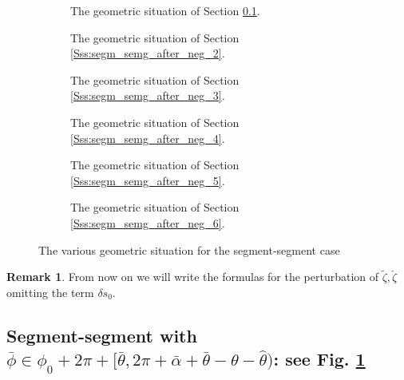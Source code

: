 \documentclass[reqno]{amsart}
\theoremstyle{definition} \newtheorem{definition}{Definition}[section]
\theoremstyle{definition} \newtheorem{remark}[definition]{Remark}
\theoremstyle{plain} \newtheorem{lemma}[definition]{Lemma}
\theoremstyle{plain} \newtheorem{proposition}[definition]{Proposition}
\theoremstyle{plain} \newtheorem{theorem}[definition]{Theorem}
\theoremstyle{plain} \newtheorem{corollary}[definition]{Corollary}
\theoremstyle{definition} \newtheorem{example}[definition]{Example}
\theoremstyle{plain} \newtheorem{claim}[clai]{Claim}
\theoremstyle{definition} \newtheorem{assumption}[definition]{Assumption}
\theoremstyle{definition} \newtheorem{observation}[definition]{Observation}
\newcommand{\1}{\mathbbm 1}
\numberwithin{equation}{section} %
\theoremstyle{plain} \newtheorem*{theorem*}{Theorem}
\theoremstyle{plain} \newtheorem{mthm}[maintheorem]{Main Theorem}
\theoremstyle{plain} \newtheorem*{mthm*}{Main Theorem}
\theoremstyle{plain} \newtheorem*{conjecture*}{Conjecture}
\theoremstyle{plain} \newtheorem{conjecture}[definition]{Conjecture}
\theoremstyle{plain} \newtheorem*{problem*}{Problem}
\begin{document}
\begin{figure}
\begin{subfigure}{.453\textwidth}
\resizebox{\linewidth}{!}{}
\caption{The geometric situation of Section \ref{Sss:segm_semg_after_neg}.}
\label{Fig:segm_segm_sat_1}
\end{subfigure}
\hfill
\begin{subfigure}{.453\linewidth}
\resizebox{\linewidth}{!}{}
\caption{The geometric situation of Section \ref{Sss:segm_semg_after_neg_2}.}
\label{Fig:segm_segm_sat_2}
\end{subfigure}
\begin{subfigure}{.453\textwidth}
\resizebox{\linewidth}{!}{}
\caption{The geometric situation of Section \ref{Sss:segm_semg_after_neg_3}.}
\label{Fig:segm_segm_sat_3}
\end{subfigure}
\hfill
\begin{subfigure}{.453\linewidth}
\resizebox{\linewidth}{!}{}
\caption{The geometric situation of Section \ref{Sss:segm_semg_after_neg_4}.}
\label{Fig:segm_segm_sat_4}
\end{subfigure}
\begin{subfigure}{.453\textwidth}
\resizebox{\linewidth}{!}{}
\caption{The geometric situation of Section \ref{Sss:segm_semg_after_neg_5}.}
\label{Fig:segm_segm_sat_5}
\end{subfigure}
\hfill
\begin{subfigure}{.453\linewidth}
\resizebox{\linewidth}{!}{}
\caption{The geometric situation of Section \ref{Sss:segm_semg_after_neg_6}.}
\label{Fig:segm_segm_sat_6}
\end{subfigure}
\caption{The various geometric situation for the segment-segment case}
\label{Fig:segm_segm_sat_tot}
\end{figure}

\bigskip

\begin{remark}
\label{Rem:divide_deltas_0}
From now on we will write the formulas for the perturbation of $\tilde \zeta, \check \zeta$ omitting the term $\delta s_0$.
\end{remark}

\bigskip


\subsection{Segment-segment with \texorpdfstring{$\bar \phi \in \phi_0 + 2\pi + [\bar \theta,2\pi + \bar \alpha + \bar \theta - \theta - \hat \theta)$}{bar phi in phi0 + 2pi + [bar theta,2pi + bar alpha + bar theta - theta- hat theta]}: see Fig. \ref{Fig:segm_segm_sat_1}}
\label{Sss:segm_semg_after_neg}
\end{document}
